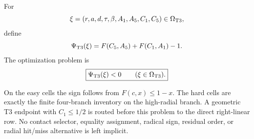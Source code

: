 \begin{definition}[Problem S2-T3]
\label{prob:s2-t3-endpoint}
For
\[
 \xi=(r,a,d,\tau,\beta,A_1,A_5,C_1,C_5)\in\Omega_{\rm T3},
\]
define
\[
 \Psi_{\rm T3}(\xi)
 =F(C_5,A_5)+F(C_1,A_1)-1.
\]
The optimization problem is
\[
 \boxed{
 \Psi_{\rm T3}(\xi)<0
 \qquad
 (\xi\in\Omega_{\rm T3}).
 }
\]
\end{definition}

On the easy cells the sign follows from \(F(c,x)\le1-x\).  The hard cells
are exactly the finite four-branch inventory on the high-radial branch.  A
geometric T3 endpoint with \(C_1\le1/2\) is routed before this problem to the
direct right-linear row.  No contact selector, equality assignment, radical
sign, residual order, or radial hit/miss alternative is left implicit.

